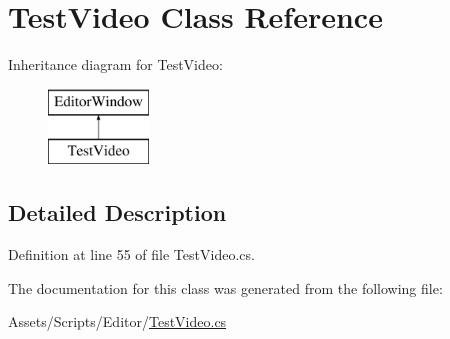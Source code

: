 \hypertarget{class_test_video}{}\section{Test\+Video Class Reference}
\label{class_test_video}
Inheritance diagram for Test\+Video\+:\begin{figure}[H]
\begin{center}
\leavevmode
\includegraphics[height=2.000000cm]{class_test_video}
\end{center}
\end{figure}


\subsection{Detailed Description}


Definition at line 55 of file Test\+Video.\+cs.



The documentation for this class was generated from the following file\+:\begin{DoxyCompactItemize}
\item 
Assets/\+Scripts/\+Editor/\mbox{\hyperlink{_test_video_8cs}{Test\+Video.\+cs}}\end{DoxyCompactItemize}
